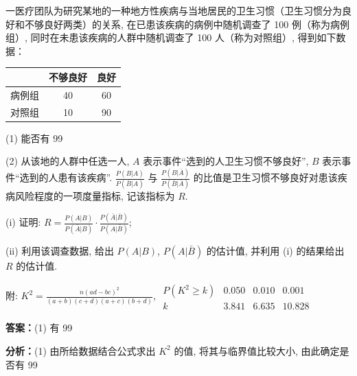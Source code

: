 \begin{question}[points=12]
一医疗团队为研究某地的一种地方性疾病与当地居民的卫生习惯（卫生习惯分为良好和不够良好两类）的关系, 在已患该疾病的病例中随机调查了 100 例（称为病例组）, 同时在未患该疾病的人群中随机调查了 100 人（称为对照组）, 得到如下数据：

\begin{center}\begin{tabular}{c|c|c}

 & 不够良好 & 良好 \\ \hline

病例组 & 40 & 60 \\

对照组 & 10 & 90 \\

\end{tabular}\end{center}

(1) 能否有 99%

(2) 从该地的人群中任选一人, $A$ 表示事件“选到的人卫生习惯不够良好”, $B$ 表示事件“选到的人患有该疾病”. $\frac{P(B|A)}{P(\bar{B}|A)}$ 与 $\frac{P(B|\bar{A})}{P(\bar{B}|\bar{A})}$ 的比值是卫生习惯不够良好对患该疾病风险程度的一项度量指标, 记该指标为 $R$.

(i) 证明: $R = \frac{P(A|B)}{P(\bar{A}|B)} \cdot \frac{P(\bar{A}|\bar{B})}{P(A|\bar{B})}$;

(ii) 利用该调查数据, 给出 $P(A|B)$, $P(A|\bar{B})$ 的估计值, 并利用 (i) 的结果给出 $R$ 的估计值.

附: $K^2 = \frac{n(ad - bc)^2}{(a+b)(c+d)(a+c)(b+d)}$, $\begin{array}{c|ccc} P(K^2 \ge k) & 0.050 & 0.010 & 0.001 \\ \hline k & 3.841 & 6.635 & 10.828 \end{array}$
\begin{solution}
\textbf{答案：}(1) 有 99%

\textbf{分析：}(1) 由所给数据结合公式求出 $K^2$ 的值, 将其与临界值比较大小, 由此确定是否有 99%


\end{solution}
\end{question}
